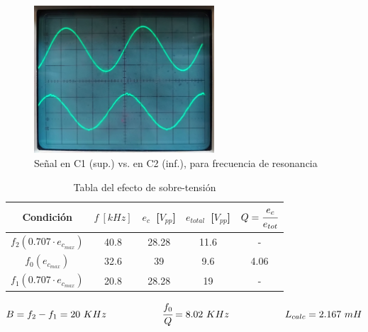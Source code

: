\begin{figure}[H]
    \centering
    \includegraphics[width=0.6\textwidth]{Imagenes/MedExp3.jpeg}
    \caption{Señal en C1 (sup.) vs. en C2 (inf.), para frecuencia de resonancia}
\end{figure}


\begin{table}[H]
    \centering
    \begin{tabular}{|c|c|c|c|c|}
    \hline
        Condición & $f~[kHz]$ & $e_c$~[$V_{pp}$] & $e_{total}$~[$V_{pp}$] & $Q = \cfrac{e_c}{e_{tot}}$ \\
    \hline
        $f_2(0.707 \cdot e_{c_{max}})$ & 40.8 & 28.28 & 11.6 & - \\ 
    \hline
        $f_0(e_{c_{max}})$ & 32.6 & 39 & 9.6 & 4.06 \\ 
    \hline
        $f_1(0.707 \cdot e_{c_{max}})$ & 20.8 & 28.28 & 19 & - \\ 
    \hline    
    
        \end{tabular}
        \def\tablename{Tabla} 
        \caption{Tabla del efecto de sobre-tensión}
        \label{tab:exp3}
\end{table}


\begin{equation*}
    B = f_2 - f_1 = 20~KHz
    \hspace{2cm}
    \cfrac{f_0}{Q} = %
        8.02~KHz
    \hspace{2cm}
    L_{calc}=2.167~mH
\end{equation*}

